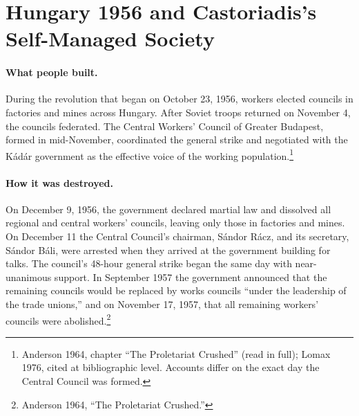 \documentclass[10pt,twoside,openany]{book}
\theoremstyle{dpepstyle}
\begin{document}
\section{Hungary 1956 and Castoriadis's Self-Managed Society}
\label{sec:hist-hungary}

\paragraph{What people built.} During the revolution that began on October 23, 1956, workers elected councils in factories and mines across Hungary. After Soviet troops returned on November 4, the councils federated. The Central Workers' Council of Greater Budapest, formed in mid-November, coordinated the general strike and negotiated with the Kádár government as the effective voice of the working population.\footnote{Anderson 1964, chapter ``The Proletariat Crushed'' (read in full); Lomax 1976, cited at bibliographic level. Accounts differ on the exact day the Central Council was formed.}

\paragraph{How it was destroyed.} On December 9, 1956, the government declared martial law and dissolved all regional and central workers' councils, leaving only those in factories and mines. On December 11 the Central Council's chairman, Sándor Rácz, and its secretary, Sándor Báli, were arrested when they arrived at the government building for talks. The council's 48-hour general strike began the same day with near-unanimous support. In September 1957 the government announced that the remaining councils would be replaced by works councils ``under the leadership of the trade unions,'' and on November 17, 1957, that all remaining workers' councils were abolished.\footnote{Anderson 1964, ``The Proletariat Crushed.''}
\end{document}
